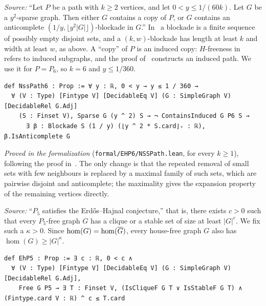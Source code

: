 \begin{importedthm}\label{imp:path}
\emph{Source:} ``Let $P$ be a path with $k\ge2$ vertices, and let $0<y\le1/(60k)$. Let $G$ be a
$y^2$-sparse graph. Then either $G$ contains a copy of $P$, or $G$ contains an anticomplete
$(1/y,\lfloor y^2|G|\rfloor)$-blockade in $G$.'' In~\cite{NSS5} a blockade is a finite sequence of possibly
empty disjoint sets, and a $(k,w)$-blockade has length at least $k$ and width at least $w$, as above. A
``copy'' of $P$ is an induced copy: $H$-freeness in~\cite{NSS5} refers to induced subgraphs, and the
proof of~\cite[3.1]{NSS5} constructs an induced path. We use it for $P=P_6$, so $k=6$ and $y\le1/360$.
\begin{lstlisting}
def NssPath6 : Prop := ∀ y : ℝ, 0 < y → y ≤ 1 / 360 →
  ∀ (V : Type) [Fintype V] [DecidableEq V] (G : SimpleGraph V) [DecidableRel G.Adj]
    (S : Finset V), Sparse G (y ^ 2) S → ¬ ContainsInduced G P6 S →
      ∃ β : Blockade S (1 / y) (⌊y ^ 2 * S.card⌋₊ : ℝ), β.IsAnticomplete G
\end{lstlisting}
\emph{Proved in the formalization} (\texttt{formal/EHP6/NSSPath.lean}, for every $k\ge1$), following the
proof in~\cite{NSS5}. The only change is that the repeated removal of small sets with few neighbours
is replaced by a maximal family of such sets, which are pairwise disjoint and anticomplete; the maximality
gives the expansion property of the remaining vertices directly.
\end{importedthm}

\begin{importedthm}\label{imp:eh5}
\emph{Source:} ``$P_5$ satisfies the Erd\H{o}s--Hajnal conjecture,'' that is, there exists $c>0$ such that
every $P_5$-free graph $G$ has a clique or a stable set of size at least $|G|^{c}$. We fix such a
$\kappa>0$. Since $\hom(G)=\hom(\overline{G})$, every house-free graph $G$ also has $\hom(G)\ge|G|^{\kappa}$.
\begin{lstlisting}
def EhP5 : Prop := ∃ c : ℝ, 0 < c ∧
  ∀ (V : Type) [Fintype V] [DecidableEq V] (G : SimpleGraph V) [DecidableRel G.Adj],
    Free G P5 → ∃ T : Finset V, (IsCliqueF G T ∨ IsStableF G T) ∧ (Fintype.card V : ℝ) ^ c ≤ T.card
\end{lstlisting}
\end{importedthm}

